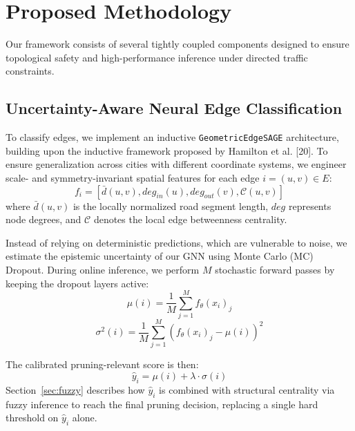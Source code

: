 \documentclass[journal]{IEEEtran}
\begin{document}
\section{Proposed Methodology}

Our framework consists of several tightly coupled components designed to ensure topological safety and high-performance inference under directed traffic constraints.

\subsection{Uncertainty-Aware Neural Edge Classification}
To classify edges, we implement an inductive \texttt{GeometricEdgeSAGE} architecture, building upon the inductive framework proposed by Hamilton et al. [20]. To ensure generalization across cities with different coordinate systems, we engineer scale- and symmetry-invariant spatial features for each edge $i = (u, v) \in E$:
\begin{equation}
    f_i = \left[ \bar{d}(u,v), deg_{in}(u), deg_{out}(v), \mathcal{C}(u, v) \right]
\end{equation}
where $\bar{d}(u, v)$ is the locally normalized road segment length, $deg$ represents node degrees, and $\mathcal{C}$ denotes the local edge betweenness centrality.

Instead of relying on deterministic predictions, which are vulnerable to noise, we estimate the epistemic uncertainty of our GNN using Monte Carlo (MC) Dropout. During online inference, we perform $M$ stochastic forward passes by keeping the dropout layers active:
\begin{equation}
    \mu(i) = \frac{1}{M} \sum_{j=1}^{M} f_\theta(x_i)_j
\end{equation}
\begin{equation}
    \sigma^2(i) = \frac{1}{M} \sum_{j=1}^{M} \left( f_\theta(x_i)_j - \mu(i) \right)^2
\end{equation}

The calibrated pruning-relevant score is then:
\begin{equation}
    \hat{y}_i = \mu(i) + \lambda \cdot \sigma(i)
\end{equation}
Section~\ref{sec:fuzzy} describes how $\hat{y}_i$ is combined with structural centrality via fuzzy inference to reach the final pruning decision, replacing a single hard threshold on $\hat{y}_i$ alone.
\end{document}
